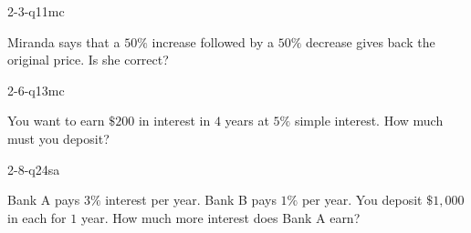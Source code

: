 \documentclass[12pt, fleqn, openany]{studyGuide}
\begin{document}
\begin{practiceQuestion}{2-3-q11}{mc}
\begin{questionText}
Miranda says that a $50\%$ increase followed by a $50\%$ decrease gives back the original price. Is she correct?
\end{questionText}
\end{practiceQuestion}

\begin{practiceQuestion}{2-6-q13}{mc}
\begin{questionText}
You want to earn $\$200$ in interest in $4$ years at $5\%$ simple interest. How much must you deposit?
\end{questionText}
\end{practiceQuestion}

\begin{practiceQuestion}{2-8-q24}{sa}
\begin{questionText}
Bank A pays $3\%$ interest per year. Bank B pays $1\%$ per year. You deposit $\$1{,}000$ in each for $1$ year. How much more interest does Bank A earn?
\end{questionText}
\end{practiceQuestion}
\end{document}
